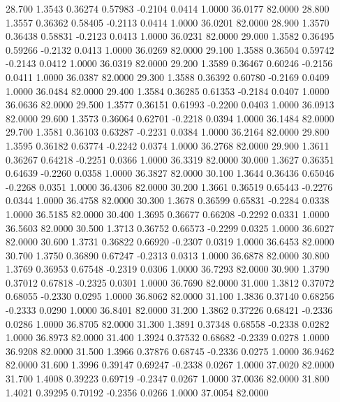   28.700   1.3543   0.36274   0.57983  -0.2104   0.0414   1.0000  36.0177  82.0000
  28.800   1.3557   0.36362   0.58405  -0.2113   0.0414   1.0000  36.0201  82.0000
  28.900   1.3570   0.36438   0.58831  -0.2123   0.0413   1.0000  36.0231  82.0000
  29.000   1.3582   0.36495   0.59266  -0.2132   0.0413   1.0000  36.0269  82.0000
  29.100   1.3588   0.36504   0.59742  -0.2143   0.0412   1.0000  36.0319  82.0000
  29.200   1.3589   0.36467   0.60246  -0.2156   0.0411   1.0000  36.0387  82.0000
  29.300   1.3588   0.36392   0.60780  -0.2169   0.0409   1.0000  36.0484  82.0000
  29.400   1.3584   0.36285   0.61353  -0.2184   0.0407   1.0000  36.0636  82.0000
  29.500   1.3577   0.36151   0.61993  -0.2200   0.0403   1.0000  36.0913  82.0000
  29.600   1.3573   0.36064   0.62701  -0.2218   0.0394   1.0000  36.1484  82.0000
  29.700   1.3581   0.36103   0.63287  -0.2231   0.0384   1.0000  36.2164  82.0000
  29.800   1.3595   0.36182   0.63774  -0.2242   0.0374   1.0000  36.2768  82.0000
  29.900   1.3611   0.36267   0.64218  -0.2251   0.0366   1.0000  36.3319  82.0000
  30.000   1.3627   0.36351   0.64639  -0.2260   0.0358   1.0000  36.3827  82.0000
  30.100   1.3644   0.36436   0.65046  -0.2268   0.0351   1.0000  36.4306  82.0000
  30.200   1.3661   0.36519   0.65443  -0.2276   0.0344   1.0000  36.4758  82.0000
  30.300   1.3678   0.36599   0.65831  -0.2284   0.0338   1.0000  36.5185  82.0000
  30.400   1.3695   0.36677   0.66208  -0.2292   0.0331   1.0000  36.5603  82.0000
  30.500   1.3713   0.36752   0.66573  -0.2299   0.0325   1.0000  36.6027  82.0000
  30.600   1.3731   0.36822   0.66920  -0.2307   0.0319   1.0000  36.6453  82.0000
  30.700   1.3750   0.36890   0.67247  -0.2313   0.0313   1.0000  36.6878  82.0000
  30.800   1.3769   0.36953   0.67548  -0.2319   0.0306   1.0000  36.7293  82.0000
  30.900   1.3790   0.37012   0.67818  -0.2325   0.0301   1.0000  36.7690  82.0000
  31.000   1.3812   0.37072   0.68055  -0.2330   0.0295   1.0000  36.8062  82.0000
  31.100   1.3836   0.37140   0.68256  -0.2333   0.0290   1.0000  36.8401  82.0000
  31.200   1.3862   0.37226   0.68421  -0.2336   0.0286   1.0000  36.8705  82.0000
  31.300   1.3891   0.37348   0.68558  -0.2338   0.0282   1.0000  36.8973  82.0000
  31.400   1.3924   0.37532   0.68682  -0.2339   0.0278   1.0000  36.9208  82.0000
  31.500   1.3966   0.37876   0.68745  -0.2336   0.0275   1.0000  36.9462  82.0000
  31.600   1.3996   0.39147   0.69247  -0.2338   0.0267   1.0000  37.0020  82.0000
  31.700   1.4008   0.39223   0.69719  -0.2347   0.0267   1.0000  37.0036  82.0000
  31.800   1.4021   0.39295   0.70192  -0.2356   0.0266   1.0000  37.0054  82.0000
